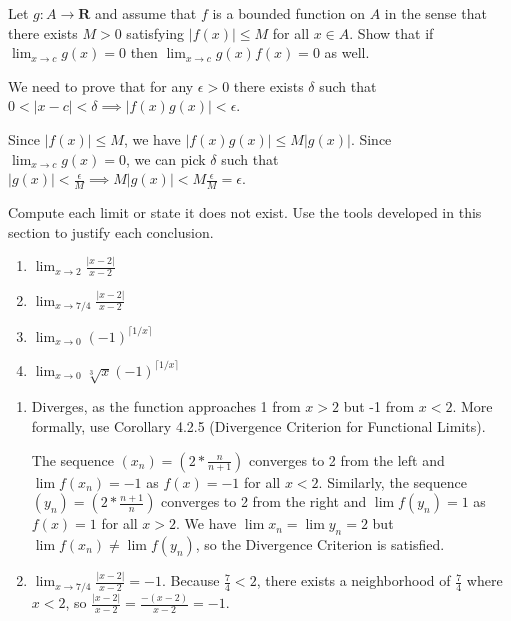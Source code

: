 \documentclass{oxmathproblems}
\begin{document}
\begin{questions}
\miquestion Let $g: A \to \textbf{R}$ and assume that $f$ is a bounded function on $A$ in the sense that there exists $M > 0$ satisfying $|f(x)| \leq M$
for all $x \in A$. Show that if $\lim_{x \to c}g(x) = 0$ then $\lim_{x \to c}g(x)f(x) = 0$ as well.

\begin{solution}
  We need to prove that for any $\epsilon > 0$ there exists $\delta$ such that $0 < |x-c| < \delta \implies |f(x)g(x)| < \epsilon$.

  Since $|f(x)| \leq M$, we have $|f(x)g(x)| \leq M|g(x)|$. Since $\lim_{x \to c}g(x) = 0$, we can pick $\delta$ such that
  $|g(x)| < \frac{\epsilon}{M} \implies M|g(x)| < M\frac{\epsilon}{M} = \epsilon$.
\end{solution}

\miquestion Compute each limit or state it does not exist. Use the tools developed in this section to justify each conclusion.
\begin{enumerate}[label=(\alph*)]
  \item $\lim_{x \to 2}\frac{|x-2|}{x-2}$
  \item $\lim_{x \to 7/4}\frac{|x-2|}{x-2}$
  \item $\lim_{x \to 0}(-1)^{\lceil 1/x \rceil}$
  \item $\lim_{x \to 0}\sqrt[3]{x}(-1)^{\lceil 1/x \rceil}$
\end{enumerate}

\begin{solution}
  \begin{enumerate}[label=(\alph*)]
    \item Diverges, as the function approaches 1 from $x > 2$ but -1 from $x < 2$. More formally, use Corollary 4.2.5
    (Divergence Criterion for Functional Limits).
    
    The sequence $(x_{n}) = (2 * \frac{n}{n+1})$ converges to 2 from the left and $\lim f(x_{n}) = -1$ as $f(x) = -1$ for all $x < 2$.
    Similarly, the sequence $(y_{n}) = (2 * \frac{n+1}{n})$ converges to 2 from the right and
    $\lim f(y_{n}) = 1$ as $f(x) = 1$ for all $x > 2$. We have $\lim x_{n} = \lim y_{n} = 2$ but $\lim f(x_{n}) \neq \lim f(y_{n})$, so the Divergence
    Criterion is satisfied.

    \item $\lim_{x \to 7/4}\frac{|x-2|}{x-2} = -1$. Because $\frac{7}{4} < 2$, there exists a neighborhood of $\frac{7}{4}$ where $x < 2$, so
    $\frac{|x-2|}{x-2} = \frac{-(x-2)}{x-2} = -1$.


\end{enumerate}
\end{solution}
\end{questions}
\end{document}
